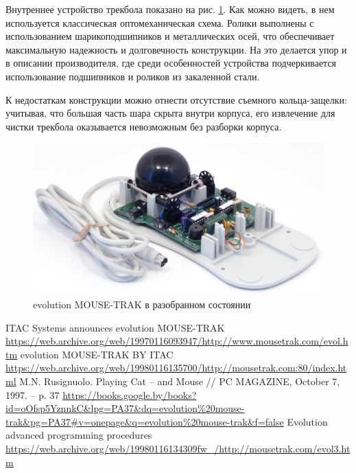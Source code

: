 \documentclass[11pt, a4paper]{article}
\begin{document}
Внутреннее устройство трекбола показано на рис. \ref{fig:evolutionMOUSE-TRAKInside}. Как можно видеть, в нем используется классическая оптомеханическая схема. Ролики выполнены с использованием шарикоподшипников и металлических осей, что обеспечивает максимальную надежность и долговечность конструкции. На это делается упор и в описании производителя, где среди особенностей устройства подчеркивается использование подшипников и роликов из закаленной стали.

К недостаткам конструкции можно отнести отсутствие съемного кольца-защелки: учитывая, что большая часть шара скрыта внутри корпуса, его извлечение для чистки трекбола оказывается невозможным без разборки корпуса.

\begin{figure}[h]
    \centering
    \includegraphics[scale=0.5]{1997_mousetrak_evolution/inside_30.jpg}
    \caption{evolution MOUSE-TRAK в разобранном состоянии}
    \label{fig:evolutionMOUSE-TRAKInside}
\end{figure}

\begin{thebibliography}{9}
 ITAC Systems announces evolution MOUSE-TRAK \url{https://web.archive.org/web/19970116093947/http://www.mousetrak.com/evol.htm}
 evolution MOUSE-TRAK BY ITAC \url{https://web.archive.org/web/19980116135700/http://mousetrak.com:80/index.html}
 M.N. Rusignuolo. Playing Cat -- and Mouse // PC MAGAZINE, October 7, 1997. -- p. 37 \url{https://books.google.by/books?id=oOfsp5YznnkC&lpg=PA37&dq=evolution%20mouse-trak&pg=PA37#v=onepage&q=evolution%20mouse-trak&f=false}
 Evolution advanced programming procedures \url{https://web.archive.org/web/19980116134309fw_/http://mousetrak.com/evol3.htm}
\end{thebibliography}
\end{document}
